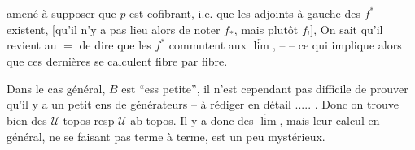 amené à supposer que  $p$ est  cofibrant,
i.e. que les adjoints \uline{à gauche} des $f^*$ existent,
[qu'il n'y a pas lieu alors de noter $f_*$, mais
plutôt $f_!$], 
On sait qu'il revient au $=$ de
dire que les $f^*$ commutent aux  $\underleftarrow{\lim}$,
-- -- ce qui implique alors que ces dernières
se calculent fibre par fibre.


Dans le cas général,  $B$ est  ``ess petite'',
il n'est cependant pas difficile de prouver
qu'il y a un petit ens de générateurs
-- à rédiger en détail ..... . Donc on
trouve bien des $\mathcal U$-topos resp $\mathcal U$-ab-topos.
Il y a donc des $\underleftarrow{\lim}$, mais leur
calcul en général, ne se faisant pas
terme à terme, est un peu mystérieux.

